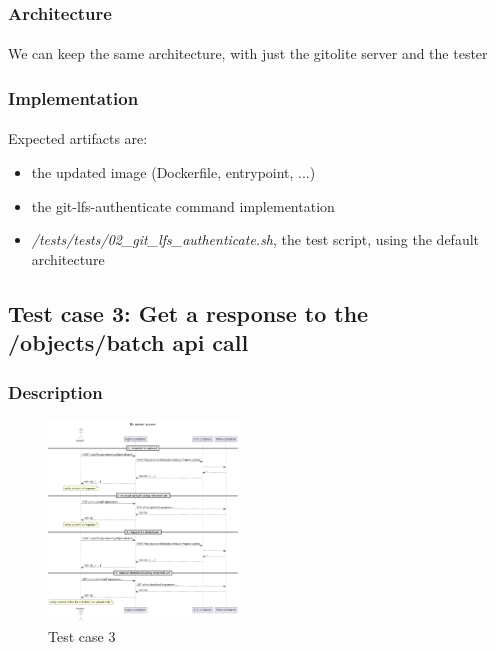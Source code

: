 \subsubsection{Architecture}

\paragraph{}
We can keep the same architecture, with just the gitolite server and the tester

\subsubsection{Implementation}

\paragraph{}
Expected artifacts are:

\begin{itemize}
    \item the updated image (Dockerfile, entrypoint, ...)
    \item the git-lfs-authenticate command implementation
    \item \textit{/tests/tests/02\_git\_lfs\_authenticate.sh}, the test script, using the default architecture
\end{itemize}

\newpage
\subsection{Test case 3: Get a response to the /objects/batch api call}

\subsubsection{Description}

\begin{figure}
    \begin{center}
        \includegraphics[width=0.45\textwidth]{iteration_03/diagrams/lfs_server_access}
    \end{center}
    \caption{Test case 3}
\end{figure}

